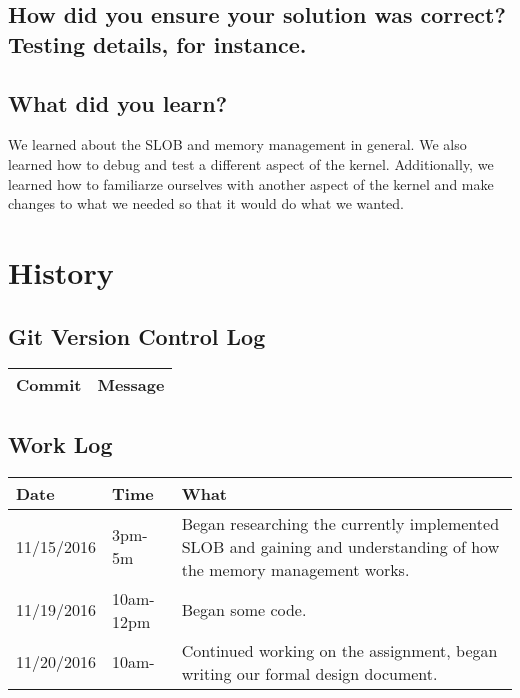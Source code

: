 \documentclass[letterpaper,10pt,titlepage]{article}
\begin{document}
\subsection{How did you ensure your solution was correct? Testing details, for instance.}

\sloppy  

\subsection{What did you learn?}

\sloppy  We learned about the SLOB and memory management in general.
We also learned how to debug and test a different aspect of the kernel.
Additionally, we learned how to familiarze ourselves with another aspect of the kernel and make changes to what we needed so that it would do what we wanted.


\section {History}
\subsection {Git Version Control Log}
\begin{tabular}{ |p{10cm}|p{3cm}| } 
 \hline
 Commit & Message \\
 \hline


\hline

\end{tabular}

\subsection{Work Log}
\begin{tabular}{ |p{3cm}|p{3cm}|p{5cm}| } 
\hline
Date & Time & What \\
\hline
11/15/2016& 3pm-5m& Began researching the currently implemented SLOB and gaining and understanding of how the memory management works. \\
 \hline
 11/19/2016& 10am-12pm& Began some code. \\
 \hline
 11/20/2016& 10am- & Continued working on the assignment, began writing our formal design document.\\
\end{tabular}
\end{document}
